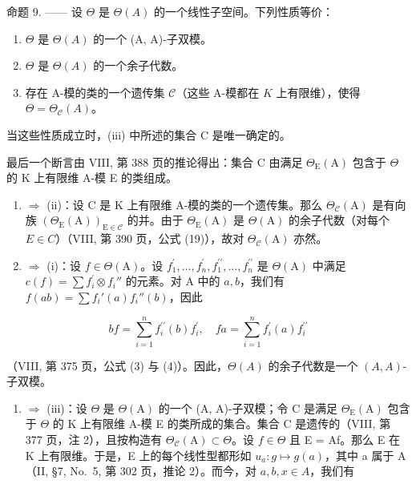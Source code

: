 命题 9. —— 设 \(\Theta\) 是 \(\Theta(A)\) 的一个线性子空间。下列性质等价：

\begin{enumerate}
\def\labelenumi{(\roman{enumi})}
\item
  \(\Theta\) 是 \(\Theta(A)\) 的一个 (A, A)-子双模。
\item
  \(\Theta\) 是 \(\Theta(A)\) 的一个余子代数。
\item
  存在 A-模的类的一个遗传集 \(\mathcal{C}\)（这些 A-模都在 \(K\) 上有限维），使得 \(\Theta = \Theta_{\mathcal{C}}(A)\)。
\end{enumerate}

当这些性质成立时，(iii) 中所述的集合 C 是唯一确定的。

最后一个断言由 VIII, 第 388 页的推论得出：集合 C 由满足 \(\Theta_{\mathrm{E}}(\mathrm{A})\) 包含于 \(\Theta\) 的 K 上有限维 A-模 E 的类组成。

\begin{enumerate}
\def\labelenumi{(\roman{enumi})}
\setcounter{enumi}{2}
\item
  \(\Rightarrow\) (ii)：设 C 是 K 上有限维 A-模的类的一个遗传集。那么 \(\Theta_{\mathcal{C}}(\mathrm{A})\) 是有向族 \((\Theta_{\mathrm{E}}(\mathrm{A}))_{\mathrm{E}\in\mathcal{C}}\) 的并。由于 \(\Theta_{\mathrm{E}}(\mathrm{A})\) 是 \(\Theta(\mathrm{A})\) 的余子代数（对每个 \(E\in C\)）（VIII, 第 390 页，公式 (19)），故对 \(\Theta_{\mathcal{C}}(\mathrm{A})\) 亦然。
\item
  \(\Rightarrow\) (i)：设 \(f\in \Theta (\mathrm{A})\)。设 \(f_{1}^{\prime},\ldots ,f_{n}^{\prime},f_{1}^{\prime \prime},\ldots ,f_{n}^{\prime \prime}\) 是 \(\Theta (\mathrm{A})\) 中满足 \(c(f) = \sum f_i^\prime \otimes f_i''\) 的元素。对 A 中的 \(a,b\)，我们有 \(f(ab) = \sum f_i'(a)f_i''(b)\)，因此
\end{enumerate}

\[
b f = \sum_ {i = 1} ^ {n} f _ {i} ^ {\prime \prime} (b) f _ {i} ^ {\prime}, \quad f a = \sum_ {i = 1} ^ {n} f _ {i} ^ {\prime} (a) f _ {i} ^ {\prime \prime}
\]

（VIII, 第 375 页，公式 (3) 与 (4)）。因此，\(\Theta(A)\) 的余子代数是一个 \((A, A)\)-子双模。

\begin{enumerate}
\def\labelenumi{(\roman{enumi})}
\tightlist
\item
  \(\Rightarrow\) (iii)：设 \(\Theta\) 是 \(\Theta(\mathrm{A})\) 的一个 (A, A)-子双模；令 C 是满足 \(\Theta_{\mathrm{E}}(\mathrm{A})\) 包含于 \(\Theta\) 的 K 上有限维 A-模 E 的类所成的集合。集合 C 是遗传的（VIII, 第 377 页，注 2），且按构造有 \(\Theta_{\mathcal{C}}(\mathrm{A}) \subset \Theta\)。设 \(f \in \Theta\) 且 E = Af。那么 E 在 K 上有限维。于是，E 上的每个线性型都形如 \(u_{a}: g \mapsto g(a)\)，其中 a 属于 A（II, §7, No.~5, 第 302 页，推论 2）。而今，对 \(a, b, x \in A\)，我们有
\end{enumerate}

